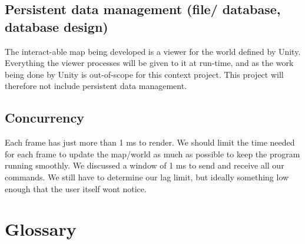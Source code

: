 \documentclass[11pt]{article}
\begin{document}
    \subsection{Persistent data management (file/ database, database design)}
    The interact-able map being developed is a viewer for the world defined by Unity. Everything the viewer processes will be given to it at run-time, and as the work being done by Unity is out-of-scope for this context project. This project will therefore not include persistent data management.
    
    \subsection{Concurrency}
    Each frame has just more than 1 ms to render. We should limit the time needed for each frame to update the map/world as much as possible to keep the program running smoothly. We discussed a window of 1 ms to send and receive all our commands. 
    We still have to determine our lag limit, but ideally something low enough that the user itself wont notice. 
    
\newpage

\section{Glossary}
\printglossary[title=]
\end{document}
